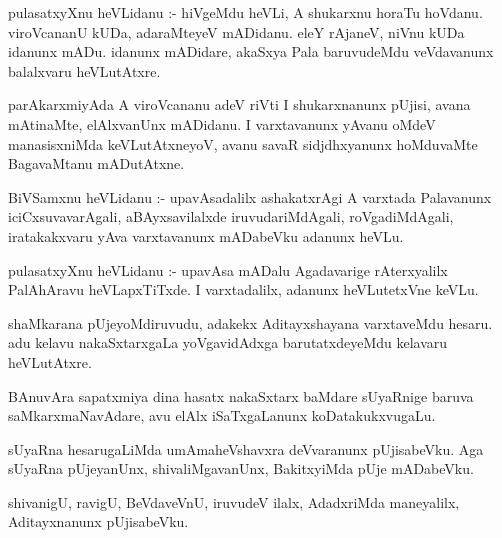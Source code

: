 \documentclass{article}
\begin{document}
\begin{mn}
pulasatxyXnu  heVLidanu :- hiVgeMdu  heVLi,  A  shukarxnu  horaTu  hoVdanu.  viroVcananU  
kUDa,  adaraMteyeV  mADidanu.  eleY  rAjaneV,  niVnu  kUDa  idanunx  mADu.  idanunx  mADidare,  
akaSxya  Pala  baruvudeMdu  veVdavanunx  balalxvaru  heVLutAtxre.
\end{mn}

\begin{mn}
parAkarxmiyAda  A  viroVcananu  adeV riVti  I  shukarxnanunx  pUjisi,  avana  mAtinaMte,  
elAlxvanUnx  mADidanu.  I  varxtavanunx  yAvanu  oMdeV  manasisxniMda  keVLutAtxneyoV,  
avanu  savaR  sidjdhxyanunx  hoMduvaMte  BagavaMtanu  mADutAtxne.
\end{mn}


\begin{mn}
BiVSamxnu  heVLidanu :- upavAsadalilx  ashakatxrAgi  A  varxtada  Palavanunx  iciCxsuvavarAgali,  aBAyxsavilalxde  
iruvudariMdAgali,  roVgadiMdAgali,  iratakakxvaru  yAva  varxtavanunx  mADabeVku  adanunx  heVLu.
\end{mn}

\begin{mn}
pulasatxyXnu  heVLidanu :- upavAsa  mADalu  Agadavarige  rAterxyalilx  PalAhAravu  heVLapxTiTxde.  
I  varxtadalilx,  adanunx  heVLutetxVne  keVLu.
\end{mn}

\begin{mn}
shaMkarana  pUjeyoMdiruvudu,  adakekx  Aditayxshayana  varxtaveMdu  hesaru.  adu  kelavu  
nakaSxtarxgaLa  yoVgavidAdxga  barutatxdeyeMdu  kelavaru  heVLutAtxre.
\end{mn}

\begin{mn}
BAnuvAra  sapatxmiya  dina  hasatx  nakaSxtarx  baMdare  sUyaRnige  baruva  saMkarxmaNavAdare,  
avu  elAlx  iSaTxgaLanunx  koDatakukxvugaLu.  
\end{mn}

\begin{mn}
sUyaRna  hesarugaLiMda  umAmaheVshavxra  deVvaranunx  pUjisabeVku.  Aga  sUyaRna  pUjeyanUnx,  
shivaliMgavanUnx,  BakitxyiMda  pUje mADabeVku.  
\end{mn}

\begin{mn}
shivanigU,  ravigU,  BeVdaveVnU,  iruvudeV  ilalx,  AdadxriMda  maneyalilx,  Aditayxnanunx  pUjisabeVku.
\end{mn}
\end{document}
